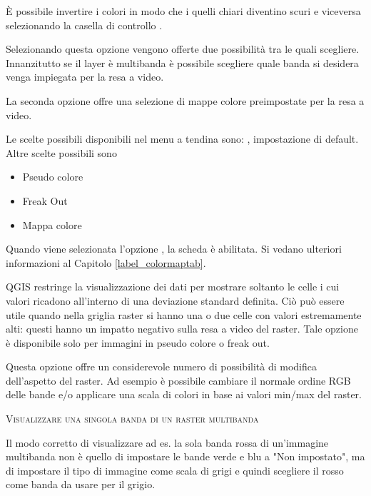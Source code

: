 È possibile invertire i colori in modo che i quelli chiari diventino scuri e
viceversa selezionando la casella di controllo .


Selezionando questa opzione vengono offerte due possibilità tra le quali
scegliere. Innanzitutto se il layer è multibanda è possibile scegliere quale
banda si desidera venga impiegata per la resa a video. 

La seconda opzione offre una selezione di mappe colore preimpostate per la
resa a video.

Le scelte possibili disponibili nel menu a tendina sono:
, impostazione di default.
Altre scelte possibili sono
\begin{itemize}
\item Pseudo colore
\item Freak Out
\item Mappa colore
\end{itemize}

Quando viene selezionata l'opzione ,
la scheda  è abilitata. Si vedano ulteriori
informazioni al Capitolo \ref{label_colormaptab}.

QGIS restringe la visualizzazione dei dati per mostrare soltanto le celle i cui 
valori ricadono all'interno di una deviazione standard definita. 
Ciò può essere utile quando nella griglia raster si hanno una o due celle 
con valori estremamente alti: questi hanno un impatto negativo sulla resa a video del raster.
Tale opzione è disponibile solo per immagini in pseudo colore o freak out. 


Questa opzione offre un considerevole numero di possibilità di modifica
dell'aspetto del raster. Ad esempio è possibile cambiare il normale ordine RGB
delle bande e/o applicare una scala di colori in base ai valori min/max del
raster.

\begin{Tip}\caption{\textsc{Visualizzare una singola banda di un raster multibanda}}
Il modo corretto di visualizzare ad es. la sola banda rossa di
un'immagine multibanda non è quello di impostare le bande verde e blu a "Non
impostato", ma di impostare il tipo di immagine come scala di grigi e quindi
scegliere il rosso come banda da usare per il grigio.
\end{Tip} 

